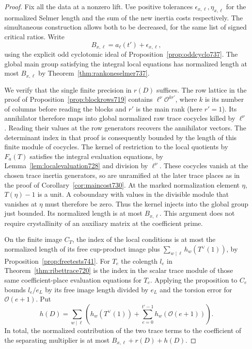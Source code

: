 \documentclass[a4paper,11pt]{article}
\theoremstyle{definition}
\theoremstyle{remark}
\numberwithin{equation}{section}
\begin{document}
\begin{proof}
Fix all the data at a nonzero lift. Use positive tolerances
\(\epsilon_{x,\ell},\eta_{x,\ell}\) for the normalized Selmer
length and the sum of the new inertia costs respectively. The
simultaneous construction allows both to be decreased, for the
same list of signed critical ratios. Write
\[
   B_{x,\ell}=a_\ell(t')+\epsilon_{x,\ell},
\]
using the explicit odd cyclotomic ideal of
Proposition~\ref{prop:oddcyclo737}. The global main group
satisfying the integral local equations has normalized length
at most \(B_{x,\ell}\) by Theorem~\ref{thm:rankoneselmer737}.

We verify that the single finite precision in \(r(D)\) suffices.
The row lattice in the proof of Proposition~\ref{prop:blockrows719}
contains \(\ell^\nu\mathcal O^{kr'}\), where \(k\) is its number of
columns before reading the blocks and \(r'\) is the main rank
(here \(r'=1\)). Its annihilator therefore maps into global
normalized raw trace cocycles killed by \(\ell^\nu\). Reading
their values at the row generators recovers the annihilator
vectors. The determinant index in that proof is consequently
bounded by the length of this finite module of cocycles.
The kernel of restriction to the local quotients by
\(F_a(T)\) satisfies the integral evaluation equations, by
Lemma~\ref{lem:localevaluation728} and division by \(\ell^\nu\).
These cocycles vanish at the chosen trace inertia generators,
so are unramified at the later trace places as in the proof of
Corollary~\ref{cor:maincost730}. At the marked normalization
element \(\eta\), \(T(\eta)-1\) is a unit. A coboundary with
values in the divisible module that vanishes at \(\eta\) must
therefore be zero. Thus the kernel injects into the global
group just bounded. Its normalized length is at most
\(B_{x,\ell}\). This argument does not require crystallinity
of an auxiliary matrix at the coefficient prime.

On the finite image \(C_T\), the index of the local conditions
is at most the normalized length of its free cup-product image
plus \(\sum_{w\mid\ell}h_w(T^\vee(1))\), by
Proposition~\ref{prop:freetests741}. For \(T_e\) the colength
\(l_e\) in Theorem~\ref{thm:ribettrace720} is the index in
the scalar trace module of those same coefficient-place
evaluation equations for \(T_e\). Applying the proposition
to \(C_e\) bounds \(l_e/e_L\) by its free image length divided
by \(e_L\) and the torsion error for \(\mathcal O(e+1)\).
Put
\[
 h(D)=\sum_{w\mid\ell}
       \left(h_w(T^\vee(1))+\sum_{e=0}^{t'-1}h_w(\mathcal O(e+1))\right).
\]
In total, the normalized contribution of the two trace terms
to the coefficient of the separating multiplier is at most
\(B_{x,\ell}+r(D)+h(D)\).


\end{proof}
\end{document}
